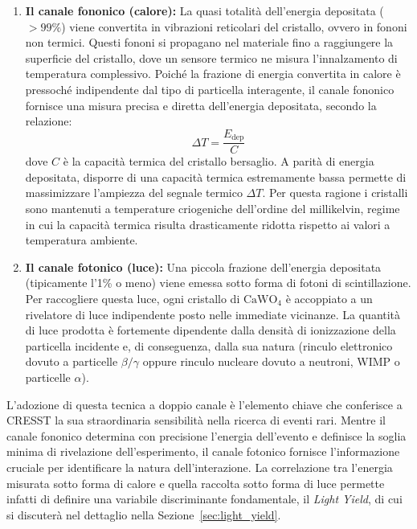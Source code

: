 \begin{enumerate}
    \item \textbf{Il canale fononico (calore):} La quasi totalità dell'energia depositata ($>99\%$) viene convertita in vibrazioni reticolari del cristallo, ovvero in fononi non termici. Questi fononi si propagano nel materiale fino a raggiungere la superficie del cristallo, dove un sensore termico ne misura l'innalzamento di temperatura complessivo. Poiché la frazione di energia convertita in calore è pressoché indipendente dal tipo di particella interagente, il canale fononico fornisce una misura precisa e diretta dell'energia depositata, secondo la relazione:
    \begin{equation}
        \Delta T = \frac{E_{\text{dep}}}{C}
    \end{equation}
    dove $C$ è la capacità termica del cristallo bersaglio. A parità di energia depositata, disporre di una capacità termica estremamente bassa permette di massimizzare l'ampiezza del segnale termico $\Delta T$. Per questa ragione i cristalli sono mantenuti a temperature criogeniche dell'ordine del millikelvin, regime in cui la capacità termica risulta drasticamente ridotta rispetto ai valori a temperatura ambiente.
    
    \item \textbf{Il canale fotonico (luce):} Una piccola frazione dell'energia depositata (tipicamente l'1\% o meno) viene emessa sotto forma di fotoni di scintillazione. Per raccogliere questa luce, ogni cristallo di $\text{CaWO}_4$ è accoppiato a un rivelatore di luce indipendente posto nelle immediate vicinanze. La quantità di luce prodotta è fortemente dipendente dalla densità di ionizzazione della particella incidente e, di conseguenza, dalla sua natura (rinculo elettronico dovuto a particelle $\beta/\gamma$ oppure rinculo nucleare dovuto a neutroni, WIMP o particelle $\alpha$).
\end{enumerate}

L'adozione di questa tecnica a doppio canale è l'elemento chiave che conferisce a CRESST la sua straordinaria sensibilità nella ricerca di eventi rari. Mentre il canale fononico determina con precisione l'energia dell'evento e definisce la soglia minima di rivelazione dell'esperimento, il canale fotonico fornisce l'informazione cruciale per identificare la natura dell'interazione. La correlazione tra l'energia misurata sotto forma di calore e quella raccolta sotto forma di luce permette infatti di definire una variabile discriminante fondamentale, il \textit{Light Yield}, di cui si discuterà nel dettaglio nella Sezione~\ref{sec:light_yield}.

